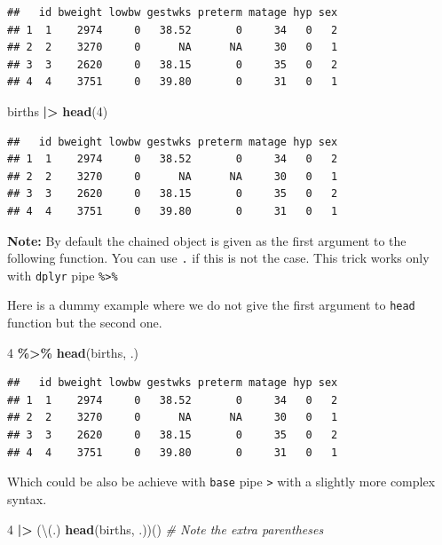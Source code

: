 \documentclass[
]{book}
\newenvironment{Shaded}{\begin{snugshade}}{\end{snugshade}}
\newcommand{\CommentTok}[1]{\textcolor[rgb]{0.56,0.35,0.01}{\textit{#1}}}
\newcommand{\DecValTok}[1]{\textcolor[rgb]{0.00,0.00,0.81}{#1}}
\newcommand{\FunctionTok}[1]{\textcolor[rgb]{0.13,0.29,0.53}{\textbf{#1}}}
\newcommand{\NormalTok}[1]{#1}
\newcommand{\SpecialCharTok}[1]{\textcolor[rgb]{0.81,0.36,0.00}{\textbf{#1}}}
\begin{document}
\begin{verbatim}
##   id bweight lowbw gestwks preterm matage hyp sex
## 1  1    2974     0   38.52       0     34   0   2
## 2  2    3270     0      NA      NA     30   0   1
## 3  3    2620     0   38.15       0     35   0   2
## 4  4    3751     0   39.80       0     31   0   1
\end{verbatim}

\begin{Shaded}
\begin{Highlighting}[]
\NormalTok{births }\SpecialCharTok{|\textgreater{}} \FunctionTok{head}\NormalTok{(}\DecValTok{4}\NormalTok{)}
\end{Highlighting}
\end{Shaded}

\begin{verbatim}
##   id bweight lowbw gestwks preterm matage hyp sex
## 1  1    2974     0   38.52       0     34   0   2
## 2  2    3270     0      NA      NA     30   0   1
## 3  3    2620     0   38.15       0     35   0   2
## 4  4    3751     0   39.80       0     31   0   1
\end{verbatim}

\textbf{Note:} By default the chained object is given as the first argument to the following
function.
You can use \texttt{.} if this is not the case. This trick works only with \texttt{dplyr} pipe \texttt{\%\textgreater{}\%}

Here is a dummy example where we do not give the first argument to \texttt{head} function but the second one.

\begin{Shaded}
\begin{Highlighting}[]
\DecValTok{4} \SpecialCharTok{\%\textgreater{}\%} \FunctionTok{head}\NormalTok{(births, .)}
\end{Highlighting}
\end{Shaded}

\begin{verbatim}
##   id bweight lowbw gestwks preterm matage hyp sex
## 1  1    2974     0   38.52       0     34   0   2
## 2  2    3270     0      NA      NA     30   0   1
## 3  3    2620     0   38.15       0     35   0   2
## 4  4    3751     0   39.80       0     31   0   1
\end{verbatim}

Which could be also be achieve with \texttt{base} pipe \texttt{\textbar{}\textgreater{}} with a slightly more complex syntax.

\begin{Shaded}
\begin{Highlighting}[]
\DecValTok{4} \SpecialCharTok{|\textgreater{}}\NormalTok{ (\textbackslash{}(.) }\FunctionTok{head}\NormalTok{(births, .))() }\CommentTok{\# Note the extra parentheses}
\end{Highlighting}
\end{Shaded}
\end{document}
